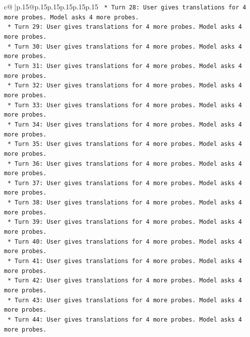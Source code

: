 \documentclass{article}
\begin{document}
{\begin{supertabular}{c@{$\;$}|p{.15\linewidth}@{}p{.15\linewidth}p{.15\linewidth}p{.15\linewidth}p{.15\linewidth}p{.15\linewidth}}
{{{\texttt{                    *   Turn 28: User gives translations for 4 more probes. Model asks 4 more probes.} \\
\texttt{                    *   Turn 29: User gives translations for 4 more probes. Model asks 4 more probes.} \\
\texttt{                    *   Turn 30: User gives translations for 4 more probes. Model asks 4 more probes.} \\
\texttt{                    *   Turn 31: User gives translations for 4 more probes. Model asks 4 more probes.} \\
\texttt{                    *   Turn 32: User gives translations for 4 more probes. Model asks 4 more probes.} \\
\texttt{                    *   Turn 33: User gives translations for 4 more probes. Model asks 4 more probes.} \\
\texttt{                    *   Turn 34: User gives translations for 4 more probes. Model asks 4 more probes.} \\
\texttt{                    *   Turn 35: User gives translations for 4 more probes. Model asks 4 more probes.} \\
\texttt{                    *   Turn 36: User gives translations for 4 more probes. Model asks 4 more probes.} \\
\texttt{                    *   Turn 37: User gives translations for 4 more probes. Model asks 4 more probes.} \\
\texttt{                    *   Turn 38: User gives translations for 4 more probes. Model asks 4 more probes.} \\
\texttt{                    *   Turn 39: User gives translations for 4 more probes. Model asks 4 more probes.} \\
\texttt{                    *   Turn 40: User gives translations for 4 more probes. Model asks 4 more probes.} \\
\texttt{                    *   Turn 41: User gives translations for 4 more probes. Model asks 4 more probes.} \\
\texttt{                    *   Turn 42: User gives translations for 4 more probes. Model asks 4 more probes.} \\
\texttt{                    *   Turn 43: User gives translations for 4 more probes. Model asks 4 more probes.} \\
\texttt{                    *   Turn 44: User gives translations for 4 more probes. Model asks 4 more probes.} \\
}}}
\end{supertabular}}
\end{document}
